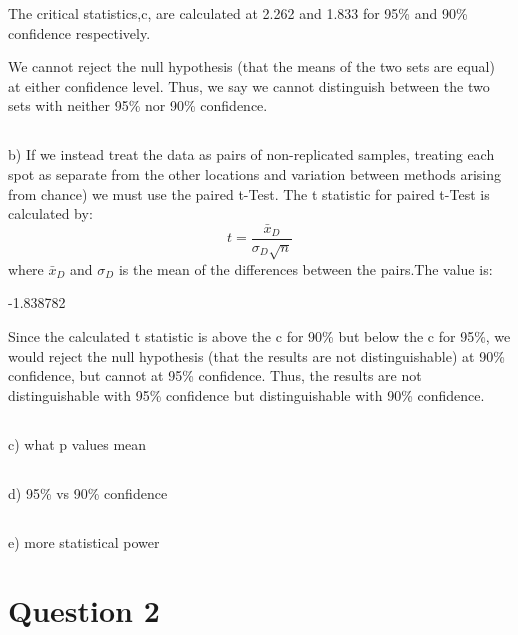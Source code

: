 \documentclass[12pt,letterpaper]{article}
\begin{document}
The critical statistics,c, are calculated at 2.262 and 1.833 for 95\% and 90\% confidence respectively.

We cannot reject the null hypothesis (that the means of the two sets are equal) at either confidence level.  Thus, we say we cannot distinguish between the two sets with neither 95\% nor 90\% confidence.


\subsection*{}
b) If we instead treat the data as pairs of non-replicated samples, treating each spot as separate from the other locations and variation between methods arising from chance) we must use the paired t-Test.  The t statistic for paired t-Test is calculated by:
\begin{equation}
t = \frac{\bar x_{D}}{\sigma_{D} \sqrt{n}}
\end{equation}
where \(\bar x_{D}\) and \(\sigma _{D}\) is the mean of the differences between the pairs.The value is:
\begin{Schunk}
\begin{Soutput}
[1] -1.838782
\end{Soutput}
\end{Schunk}


Since the calculated t statistic is above the c for 90\% but below the c for 95\%, we would reject the null hypothesis (that the results are not distinguishable) at 90\% confidence, but cannot at 95\% confidence.  Thus, the results are not distinguishable with 95\% confidence but distinguishable with 90\% confidence.

\subsection*{}
c) what p values mean
\subsection*{}
d) 95\% vs 90\% confidence
\subsection*{}
e) more statistical power


\section*{Question 2}
\end{document}
